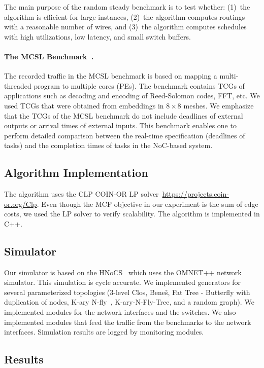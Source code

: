 \documentclass[a4paper,12pt]{article}
\newenvironment{proof sketch}[1]{\noindent {\emph{Proof sketch of #1:}}}{\hfill \qed}
\begin{document}
The main purpose of the random steady benchmark is to test whether: (1)~the algorithm
is efficient for large instances, (2)~the algorithm computes routings with a
reasonable number of wires, and (3)~the algorithm computes schedules with high
utilizations, low latency, and small switch buffers.

\paragraph{The MCSL Benchmark~\cite{liu2011noc}.} The recorded traffic in the MCSL
benchmark is based on mapping a multi-threaded program to multiple cores (PEs). The
benchmark contains TCGs of applications such as decoding and encoding of Reed-Solomon
codes, FFT, etc. We used TCGs that were obtained from embeddings in $8\times 8$
meshes. We emphasize that the TCGs of the MCSL benchmark do not include deadlines of
external outputs or arrival times of external inputs.  This benchmark enables one to
perform detailed comparison between the real-time specification (deadlines of tasks)
and the completion times of tasks in the NoC-based system.

\subsection{Algorithm Implementation}
The algorithm uses the CLP COIN-OR LP solver~\url{https://projects.coin-or.org/Clp}. Even though the MCF
objective in our experiment is the sum of edge costs, we used the LP solver to verify
scalability.  The algorithm is implemented in C++.

\subsection{Simulator}
Our simulator is based on the HNoCS~\cite{ben2012hnocs} which uses the OMNET++
network simulator. This simulation is cycle accurate. We implemented generators for
several parameterized topologies ($3$-level Clos, Bene\v{s}, Fat Tree - Butterfly
with duplication of nodes, K-ary
N-fly~\cite{theocharides2005networks,bertozzi2005noc}, K-ary-N-Fly-Tree, and a random
graph).  We implemented modules for the network interfaces and the switches. We also
implemented modules that feed the traffic from the benchmarks to the network
interfaces. Simulation results are logged by monitoring modules.

\subsection{Results}
\end{document}
